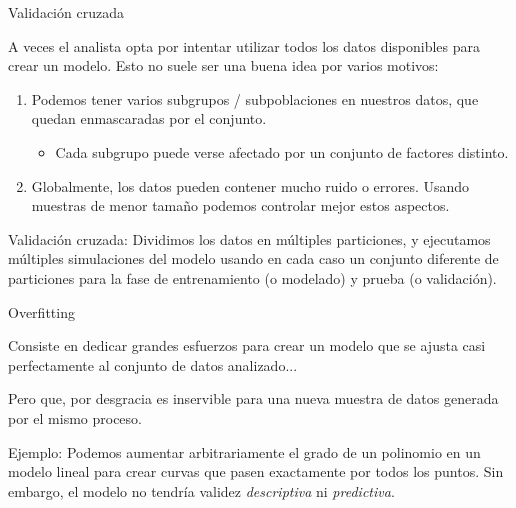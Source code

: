 \begin{frame}{Validación cruzada}
  \begin{wideitemize}
  \item A veces el analista opta por intentar utilizar todos los datos disponibles
  para crear un modelo. Esto no suele ser una buena idea por varios motivos:
  
  \begin{enumerate}
   \item Podemos tener varios subgrupos / subpoblaciones en nuestros datos, que
   quedan enmascaradas por el conjunto.
   
   \begin{itemize}
    \item Cada subgrupo puede verse afectado por un conjunto de factores distinto.
   \end{itemize}

   \item Globalmente, los datos pueden contener mucho ruido o errores. Usando
   muestras de menor tamaño podemos controlar mejor estos aspectos.
   
  \end{enumerate}

  \item Validación cruzada: Dividimos los datos en múltiples particiones, y ejecutamos
  múltiples simulaciones del modelo usando en cada caso un conjunto diferente de
  particiones para la fase de entrenamiento (o modelado) y prueba (o validación).

 \end{wideitemize}

\end{frame}


\begin{frame}{Overfitting}
  \begin{wideitemize}
  \item Consiste en dedicar grandes esfuerzos para crear un modelo que se ajusta
  casi perfectamente al conjunto de datos analizado...
  
  \item Pero que, por desgracia es inservible para una nueva muestra de datos
  generada por el mismo proceso.
  
  \item Ejemplo: Podemos aumentar arbitrariamente el grado de un polinomio en un
  modelo lineal para crear curvas que pasen exactamente por todos los puntos. Sin
  embargo, el modelo no tendría validez \textit{descriptiva} ni \textit{predictiva}.

 \end{wideitemize}

\end{frame}

